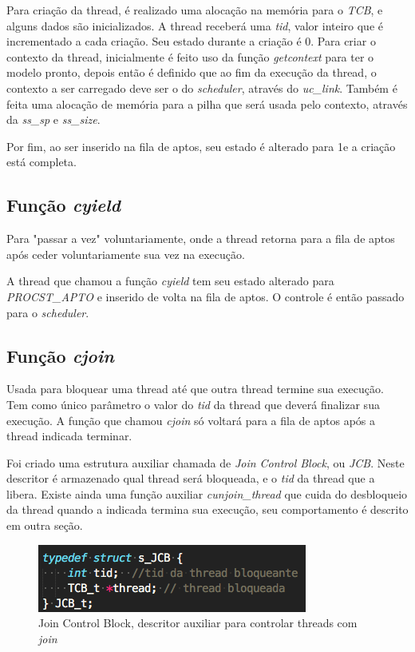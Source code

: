 \documentclass{article}
\begin{document}
Para criação da thread, é realizado uma alocação na memória para o \textit{TCB}, e alguns dados são inicializados. A thread receberá uma \textit{tid}, valor inteiro que é incrementado a cada criação. Seu estado durante a criação é 0\footnotemark. Para criar o contexto da thread, inicialmente é feito uso da função \textit{getcontext} para ter o modelo pronto, depois então é definido que ao fim da execução da thread, o contexto a ser carregado deve ser o do \textit{scheduler}, através do \textit{uc\_link}. Também é feita uma alocação de memória para a pilha que será usada pelo contexto, através da \textit{ss\_sp} e \textit{ss\_size}.

Por fim,  ao ser inserido na fila de aptos, seu estado é alterado para 1\footnotemark e a criação está completa.

\subsection{Função \textit{cyield}}
Para "passar a vez" voluntariamente, onde a thread retorna para a fila de aptos após ceder voluntariamente sua vez na execução.

A thread que chamou a função \textit{cyield} tem seu estado alterado para \textit{PROCST\_APTO} e inserido de volta na fila de aptos. O controle é então passado para o \textit{scheduler}.

\subsection{Função \textit{cjoin}}
Usada para bloquear uma thread até que outra thread termine sua execução. Tem como único parâmetro o valor do \textit{tid} da thread que deverá finalizar sua execução.
A função que chamou \textit{cjoin} só voltará para a fila de aptos após a thread indicada terminar.

Foi criado uma estrutura auxiliar chamada de \textit{Join Control Block}, ou \textit{JCB}. Neste descritor é armazenado qual thread será bloqueada, e o \textit{tid} da thread que a libera. Existe ainda uma função auxiliar \textit{cunjoin\_thread} que cuida do desbloqueio da thread quando a indicada termina sua execução, seu comportamento é descrito em outra seção.

\begin{figure}[ht]
    \centering
    \includegraphics[scale=0.4]{jcb.png}
    \caption{Join Control Block, descritor auxiliar para controlar threads com \textit{join}}
    \label{fig:sym4}
\end{figure}
\end{document}
